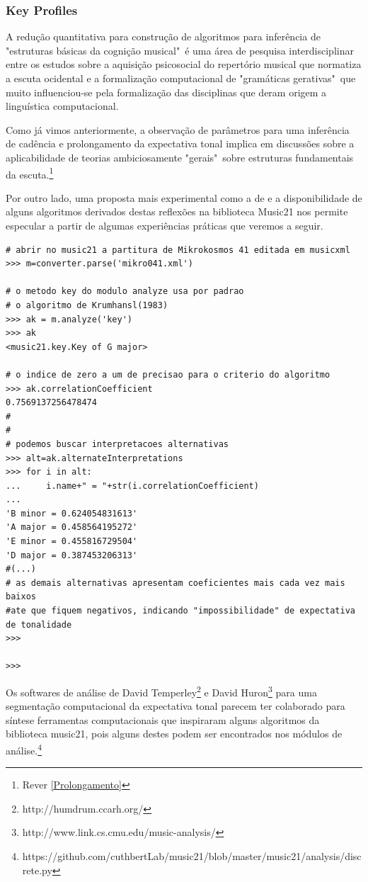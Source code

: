 \documentclass[
	12pt,				%
	openright,			%
	twoside,			%
	a4paper,			%
	english,			%
	french,				%
	spanish,			%
	brazil				%
	]{abntex2}
\begin{document}
\subsubsection{Key Profiles} 

A redução quantitativa para construção de algoritmos para inferência de "estruturas básicas da cognição musical"\cite{temperley2001cognition}\ é uma área de pesquisa interdisciplinar entre os estudos sobre a aquisição psicosocial do repertório musical que normatiza a escuta ocidental e a formalização computacional de "gramáticas gerativas"\cite[ p.83]{nierhaus2009algorithmic}\ que muito influenciou-se pela formalização das disciplinas que deram origem a linguística computacional.\cite{roads1979grammars}    

Como já vimos anteriormente, a observação de parâmetros para uma inferência de cadência e prolongamento da expectativa tonal implica em discussões sobre a aplicabilidade de teorias ambiciosamente "gerais"\ sobre estruturas fundamentais da escuta.\footnote{Rever \autoref{Prolongamento}  }

Por outro lado, uma proposta mais experimental como a de  e a disponibilidade de alguns algoritmos derivados destas reflexões na biblioteca Music21 nos permite especular a partir de algumas experiências práticas que veremos a seguir.


\begin{lstlisting}
# abrir no music21 a partitura de Mikrokosmos 41 editada em musicxml
>>> m=converter.parse('mikro041.xml')

# o metodo key do modulo analyze usa por padrao
# o algoritmo de Krumhansl(1983)
>>> ak = m.analyze('key')
>>> ak
<music21.key.Key of G major>

# o indice de zero a um de precisao para o criterio do algoritmo
>>> ak.correlationCoefficient
0.7569137256478474
#
#
# podemos buscar interpretacoes alternativas
>>> alt=ak.alternateInterpretations
>>> for i in alt:
...     i.name+" = "+str(i.correlationCoefficient)
... 
'B minor = 0.624054831613'
'A major = 0.458564195272'
'E minor = 0.455816729504'
'D major = 0.387453206313'
#(...)
# as demais alternativas apresentam coeficientes mais cada vez mais baixos 
#ate que fiquem negativos, indicando "impossibilidade" de expectativa de tonalidade
>>> 

>>> 
\end{lstlisting}

Os softwares de análise de David Temperley\footnote{http://humdrum.ccarh.org/} e David Huron\footnote{http://www.link.cs.cmu.edu/music-analysis/}  para uma segmentação computacional da expectativa tonal parecem ter colaborado para síntese ferramentas computacionais que inspiraram alguns algoritmos da biblioteca music21, pois alguns destes podem ser encontrados nos módulos de análise.\footnote{https://github.com/cuthbertLab/music21/blob/master/music21/analysis/discrete.py}
\end{document}
